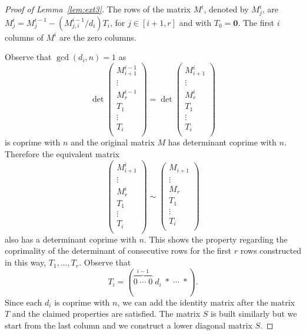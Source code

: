 \documentclass[10pt]{article}
\begin{document}
\begin{proof}[Proof of Lemma~\ref{lem:ext3}]
The rows of the matrix $M^i$, denoted by $M^i_j$, are
$M^i_{j}=M^{i-1}_j - (M^{i-1}_{j,i}/d_i) T_i$, for $j\in [i+1,r]$ and with $T_0=\mathbf{0}$.
The first $i$ columns of $M^i$ are the zero columns. 

Observe that $\gcd(d_i,n)=1$ as
\begin{displaymath}
	\det\begin{pmatrix}
		M^{i-1}_{i+1}\\
		\vdots\\
		M^{i-1}_{r}\\
	T_1\\
	\vdots \\
	T_i\\
		\end{pmatrix}=\det\begin{pmatrix}
			M^i_{i+1} \\
			\vdots \\
			M^i_r\\
		T_1\\
		\vdots\\
		T_i\\
			\end{pmatrix}
\end{displaymath}
is coprime with $n$ and the original matrix $M$ has determinant coprime with $n$. Therefore the equivalent matrix
\begin{displaymath}
 \begin{pmatrix}
		M^i_{i+1} \\
		\vdots \\
		M^i_r\\
	T_1\\
	\vdots\\
	T_i\\
		\end{pmatrix}
		\sim
		\begin{pmatrix}
			M_{i+1} \\
			\vdots \\
			M_r\\
		T_1\\
		\vdots\\
		T_i\\
		\end{pmatrix}
\end{displaymath}
also has a determinant coprime with $n$. This shows the property regarding the coprimality of the determinant of consecutive rows for the first $r$ rows constructed in this way, $T_1,\ldots,T_r$. Observe that
\begin{displaymath}
T_i=(\overbrace{0 \; \cdots \; 0}^{i-1}\; d_i \; \ast \; \cdots \; \ast).
\end{displaymath}
Since each $d_i$ is coprime with $n$, we can add the identity matrix after the matrix $T$ and the claimed properties are satisfied.
The matrix $S$
is built similarly but we start from the last column and we construct a lower diagonal matrix $S$.
\end{proof}
\end{document}
